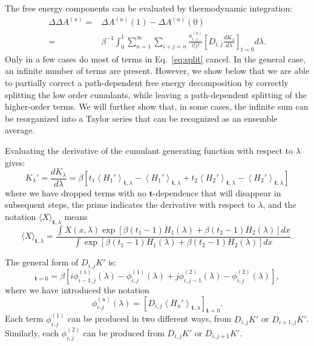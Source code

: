 \documentclass{article}
\let\vec\mathbf
\begin{document}
The free energy components can be evaluated by thermodynamic integration:
\begin{align}
\Delta\Delta A^{(u)} =& \Delta A^{(u)}(1) - \Delta A^{(u)}(0) \nonumber \\
					 =&
	\beta^{-1} \int_0^1 \sum_{n=1}^{\infty}
	\sum_{i+j=n}
	\frac{a_{i,j}^{(u)}}{i!j!}
    \left[ D_{i,j} \frac{dK_\lambda}{d\lambda}\right]_{t=0} d\lambda
    \label{eq:split}.
\end{align}
Only in a few cases do most of terms in Eq.~\ref{eq:split} cancel. In the general case, an infinite number of terms are present. However, we show below that we are able to partially correct a path-dependent free energy decomposition by correctly splitting the low order cumulants, while leaving a path-dependent splitting of the higher-order terms. We will further show that, in some cases, the infinite sum can be reorganized into a Taylor series that can be recognized as an ensemble average.

Evaluating the derivative of the cumulant generating function with respect to $\lambda$ gives:
\begin{equation}
K_\lambda' = 
\frac{dK_\lambda}{d\lambda} =
	\beta \left[
		t_1 \left\langle H_1' \right\rangle_{\vec t,\lambda} -
    	\left\langle H_1' \right\rangle_{\vec t,\lambda} +
	    t_2 \left\langle H_2' \right\rangle_{\vec t,\lambda} -
    	\left\langle H_2' \right\rangle_{\vec t,\lambda}
    \right]
\end{equation}
where we have dropped terms with no $\vec t$-dependence that will disappear in subsequent steps, the prime indicates the derivative with respect to $\lambda$, and the notation $\langle X \rangle_{\vec t, \lambda}$ means
\begin{equation}
\langle X \rangle_{\vec t, \lambda}  =
	\frac
    	{\int X(x, \lambda) 
        	\exp\left[
        		\beta(t_1-1)H_1(\lambda) +
            \beta(t_2-1)H_2(\lambda)
        \right] dx
        }
    	{\int
        	\exp\left[
            \beta(t_1-1)H_1(\lambda) +
            \beta(t_2-1)H_2(\lambda)
        \right] dx
        }.
\end{equation}

The general form of $D_{i,j}K'$ is:
\begin{equation}
[D_{i,j}K_\lambda']_{\vec t=0} =
	\beta\left[
		i \phi_{i-1, j}^{(1)}(\lambda) -
    	\phi_{i,j}^{(1)}(\lambda) +
    	j \phi_{i, j-1}^{(2)}(\lambda) -
    	\phi_{i,j}^{(2)}(\lambda)
    \right],
\label{eq:deriv}
\end{equation}
where we have introduced the notation
\begin{equation}
\phi_{i,j}^{(u)}(\lambda) =
	\left[ D_{i,j} \left\langle
    	H_u'
    \right\rangle_{\vec t, \lambda} \right]_{\vec t=0}.
\end{equation}
Each term $\phi_{i,j}^{(1)}$ can be produced in two different ways, from $D_{i,j}K'$ or $D_{i+1,j}K'$. Similarly, each $\phi_{i,j}^{(2)}$ can be produced from $D_{i,j}K'$ or $D_{i,j+1}K'$.
\end{document}
